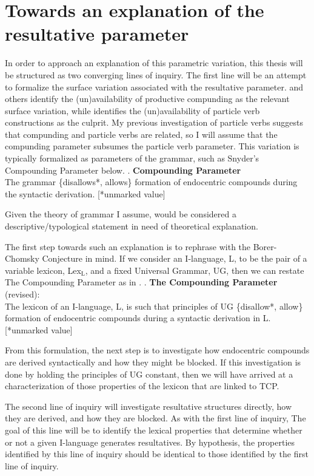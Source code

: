 \documentclass[letterpaper,12pt]{article}
\begin{document}
\section{Towards an explanation of the resultative parameter}
In order to approach an explanation of this parametric variation, this thesis will be structured as two converging lines of inquiry.
The first line will be an attempt to formalize the surface variation associated with the resultative parameter.
\textcite{snyder2001nature,roeper2002learnability,kratzer_building_2004} and others identify the (un)availability of productive compunding as the relevant surface variation, while \textcite{haider2016} identifies the (un)availability of particle verb constructions as the culprit.
My previous investigation of particle verbs \parencite[][included as an appendix]{milway2013forum} suggests that compunding and particle verbs are related, so I will assume that the compunding parameter subsumes the particle verb parameter.
This variation is typically formalized as parameters of the grammar, such as Snyder's Compounding Parameter below.
\ex. \textbf{Compounding Parameter} \parencite{snyder2001nature}\\ 
The grammar \{disallows*, allows\} formation of endocentric compounds during the syntactic derivation. [*unmarked value] 

Given the theory of grammar I assume, \Last would be considered a descriptive/typological statement in need of theoretical explanation.

The first step towards such an explanation is to rephrase \Last with the Borer-Chomsky Conjecture in mind.
If we consider an I-language, L, to be the pair of a variable lexicon, Lex$_\text{L}$, and a fixed Universal Grammar, UG, then we can restate The Compounding Parameter as in \Next.
\ex. \textbf{The Compounding Parameter} (revised):\\
The lexicon of an I-language, L, is such that principles of UG \{disallow*, allow\} formation of endocentric compounds during a syntactic derivation in L. [*unmarked value]

From this formulation, the next step is to investigate how endocentric compounds are derived syntactically and how they might be blocked.
If this investigation is done by holding the principles of UG constant, then we will have arrived at a characterization of those properties of the lexicon that are linked to TCP.

The second line of inquiry will investigate resultative structures directly, how they are derived, and how they are blocked.
As with the first line of inquiry, The goal of this line will be to identify the lexical properties that determine whether or not a given I-language generates resultatives.
By hypothesis, the properties identified by this line of inquiry should be identical to those identified by the first line of inquiry.
\end{document}
